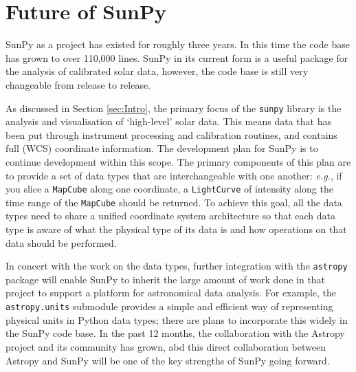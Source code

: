 \section{Future of SunPy}
SunPy as a project has existed for roughly three years. In this time 
the code 
base has grown to over 110,000 lines. SunPy in its current form is a 
useful 
package for the analysis of calibrated solar data, however, the code 
base is 
still very changeable from release to release.

As discussed in Section \ref{sec:Intro}, the primary focus of the 
\texttt{sunpy} library is the analysis and visualisation of `high-level' solar 
data. This means data that has been put through instrument processing 
and 
calibration routines, and contains full (WCS) coordinate information. 
The 
development plan for SunPy is to continue development within this 
scope. The 
primary components of this plan are to provide a set of data types 
that are 
interchangeable with one another: \textit{e.g.}, if you slice a 
\texttt{MapCube} 
along one coordinate, a \texttt{LightCurve} of intensity along the 
time range of 
the \texttt{MapCube} should be returned. To achieve this goal, all the 
data 
types need to share a unified coordinate system architecture so that 
each data 
type is aware of what the physical type of its data is and how 
operations on 
that data should be performed.

In concert with the work on the data types, further integration with 
the 
\texttt{astropy} package will enable SunPy to inherit the large 
amount of work 
done in that project to support a platform for astronomical data 
analysis. For 
example, the \texttt{astropy.units} submodule provides a simple and 
efficient 
way of representing physical units in Python data types; there are 
plans to 
incorporate this widely in the SunPy code base. In the past 12 months, 
the 
collaboration with the Astropy project 
\citep{theastropycollaboration2013} and 
its community has grown, abd this direct collaboration between Astropy 
and 
SunPy will be one of the key strengths of SunPy going forward.